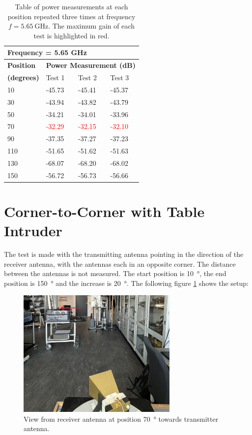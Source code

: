 \begin{table}[H]
    \centering
    \begin{tabular}{l|l|l|l}
        \multicolumn{4}{l}{\textbf{Frequency = 5.65 GHz}}         \\
        \hline
        \textbf{Position} & \multicolumn{3}{l}{\textbf{Power Measurement (dB)}} \\
        \textbf{(degrees)}  & Test 1    & Test 2  & Test 3  \\
        \hline
        \hline
        10      & -45.73    & -45.41    & -45.37 \\
        30      & -43.94    & -43.82    & -43.79 \\
        50      & -34.21    & -34.01    & -33.96 \\
        70      & \textcolor{red}{-32.29}    & \textcolor{red}{-32.15}    & \textcolor{red}{-32.10} \\
        90      & -37.35    & -37.27    & -37.23 \\
        110     & -51.65    & -51.62    & -51.63 \\
        130     & -68.07    & -68.20    & -68.02 \\
        150     & -56.72    & -56.73    & -56.66
        \end{tabular}
    \caption{Table of power measurements at each position repeated three times at frequency $f=\SI{5.65}{\giga\hertz}$. The maximum gain of each test is highlighted in red.}
    \label{tab:a2_2b}
\end{table}

\section{Corner-to-Corner with Table Intruder} \label{s:test4}
The test is made with the transmitting antenna pointing in the direction of the receiver antenna, with the antennas each in an opposite corner. The distance between the antennas is not measured. The start position is \SI{10}{\degree}, the end position is \SI{150}{\degree} and the increase is \SI{20}{\degree}. The following figure \ref{fig:a2_4} shows the setup:
\begin{figure}[H]
    \centering
    \includegraphics[width=0.7\textwidth]{figures/test_intruder_table.JPG}
    \caption{View from receiver antenna at position \SI{70}{\degree} towards transmitter antenna.} \label{fig:a2_4}
\end{figure}

